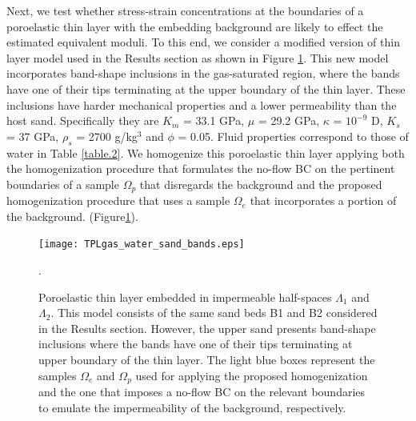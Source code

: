\documentclass[draft]{agujournal2019}
\begin{document}
Next, we test whether stress-strain concentrations at the boundaries of a poroelastic thin layer with the embedding background are likely to effect the estimated equivalent moduli. To this end, we consider a modified version of thin layer model used in the Results section as shown in Figure \ref{fig.7}. This new model incorporates band-shape inclusions in the gas-saturated region, where the bands have one of their tips terminating at the upper boundary of the thin layer. These inclusions have harder mechanical properties and a lower permeability than the host sand. Specifically they are $K_m$ = 33.1 GPa,  $\mu$ = 29.2 GPa, $\kappa$ = $10^{-9}$ D, $K_s$ = 37 GPa, $\rho_s$ = 2700 g/kg$^3$ and $\phi$ = 0.05. Fluid properties correspond to those of water in Table \ref{table.2}. We homogenize this poroelastic thin layer applying both the homogenization procedure that formulates the no-flow BC on the pertinent boundaries of a sample $\Omega_p$ that disregards the background and the proposed homogenization procedure that uses a sample $\Omega_e$ that incorporates a portion of the background. (Figure\ref{fig.7}).

\begin{figure}[!ht]
\centering
        \texttt{[image: TPLgas\_water\_sand\_bands.eps]}
\caption{Poroelastic thin layer embedded in impermeable half-spaces $\Lambda_1$ and $\Lambda_2$. This model consists of the same sand beds B1 and B2 considered in the Results section. However, the upper sand presents band-shape inclusions where the bands have one of their tips terminating at upper boundary of the thin layer. The light blue boxes represent the samples $\Omega_e$ and $\Omega_p$ used for applying the proposed homogenization and the one that imposes a no-flow BC on the relevant boundaries to emulate the impermeability of the background, respectively.}. 
\label{fig.7}
\end{figure}
\end{document}
